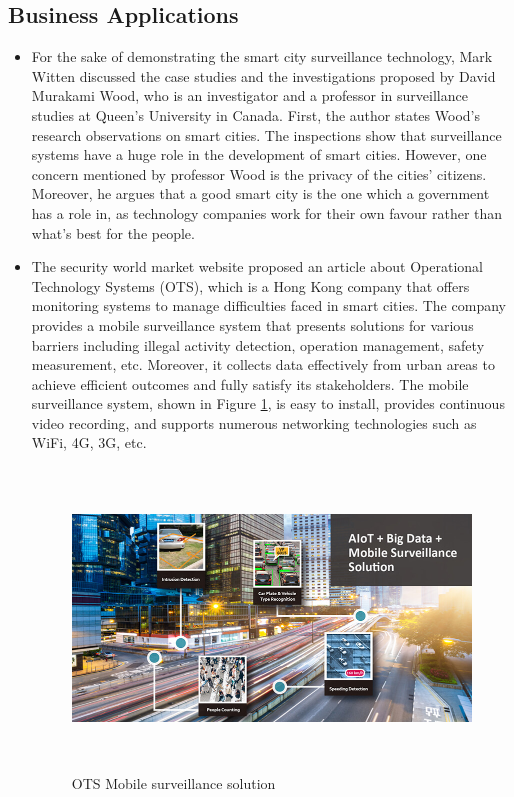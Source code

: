 \documentclass[12pt]{article}
\begin{document}
\subsection{Business Applications}
\begin{itemize}
\item  For the sake of demonstrating the smart city surveillance technology, Mark Witten \cite{witten_2020} discussed the case studies and the investigations proposed by David Murakami Wood, who is an investigator and a professor in surveillance studies at Queen’s University in Canada. First, the author states Wood’s  research observations on smart cities. The inspections show that surveillance systems have a huge role in the development of smart cities. However, one concern mentioned by professor Wood is the privacy of the cities’ citizens. Moreover, he argues that a good smart city is the one which a government has a role in, as technology companies work for their own favour rather than what’s best for the people.

\item The security world market website \cite{securityworldmarket.com} proposed an article about Operational Technology Systems (OTS), which is a Hong Kong company that offers monitoring systems to manage difficulties faced in smart cities. The company provides a mobile surveillance system that presents solutions for various barriers including illegal activity detection, operation management, safety measurement, etc. Moreover, it collects data effectively from urban areas to achieve efficient outcomes and fully satisfy its stakeholders. The mobile surveillance system, shown in Figure \ref{mobile}, is easy to install, provides continuous video recording, and supports numerous networking technologies such as WiFi, 4G, 3G, etc.
\begin{figure}[!ht]
\centering
 \begin{minipage}{.5\textwidth}
  \includegraphics[width=12.0cm, height=8.0cm]{20190926-The-Intelligent-Traffic-Solution-Day-02.jpg}
  \caption{   OTS Mobile surveillance solution}
  \label{mobile}
 \end{minipage}
\end{figure}


\end{itemize}
\end{document}
